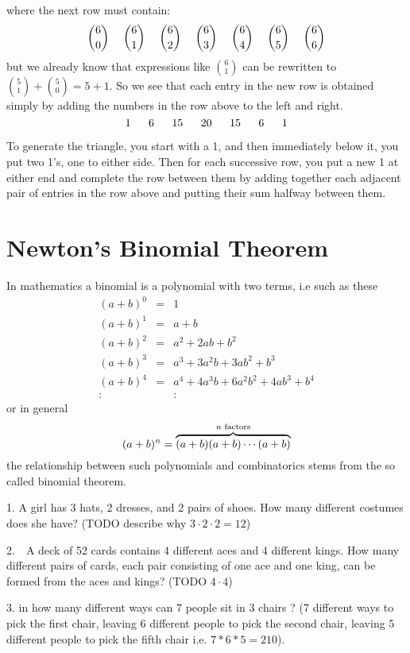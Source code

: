 where the next row must contain:
\[
\binom{6}{0} \hspace{0.45cm} \binom{6}{1} \hspace{0.45cm} \binom{6}{2} \hspace{0.45cm} \binom{6}{3} \hspace{0.45cm} \binom{6}{4} \hspace{0.45cm} \binom{6}{5} \hspace{0.45cm} \binom{6}{6}
\]
but we already know that expressions like $\binom{6}{1}$ can be rewritten to
$\binom{5}{1} + \binom{5}{0} = 5 + 1$. So we see that each entry in the new row
is obtained simply by adding the numbers in the row above to the left and right.
\[
1\ \myindent 6\ \myindent 15\ \myindent 20\ \myindent 15\ \myindent 6\ \myindent 1
\]

To generate the triangle, you start with a 1, and then immediately below it, you put two 1’s, one to either side. Then for each successive row, you put a new 1 at either end and complete the row between them by adding together each adjacent pair of entries in the row above and putting their sum halfway between them.


\newpage
\section{Newton's Binomial Theorem}
In mathematics a binomial is a polynomial with two terms, i.e such as these
\[\begin{array}{lcl}
(a + b)^0 &=& 1\\
(a + b)^1 &=& a + b \\
(a + b)^2 &=& a^2 + 2ab + b^2 \\
(a + b)^3 &=& a^3 + 3a^2b + 3ab^2 + b^3 \\
(a + b)^4 &=& a^4 + 4a^3b + 6a^2b^2 + 4ab^3 + b^4 \\
:                &   & :
\end{array}\]
or in general
\[
(a+b)^n = \overbrace{(a+b)(a+b)\cdots(a+b)}^{n\textnormal{ factors}}
\]
the relationship between such polynomials and combinatorics stems from the so
called binomial theorem.


1.  A girl has 3 hats, 2 dresses, and 2 pairs of shoes. How many different costumes does she have? (TODO describe why $3 \cdot 2 \cdot 2 = 12$)

2.  A deck of 52 cards contains 4 different aces and 4 different kings. How many different pairs of cards, each pair consisting of one ace and one king, can be formed from the aces and kings?  (TODO $4 \cdot 4$)

3. in how many different ways can 7 people sit in 3 chairs ? (7 different ways to pick the first chair, leaving 6 different people to pick the second chair, leaving 5 different people to pick the fifth chair i.e. $7*6*5 = 210$).

